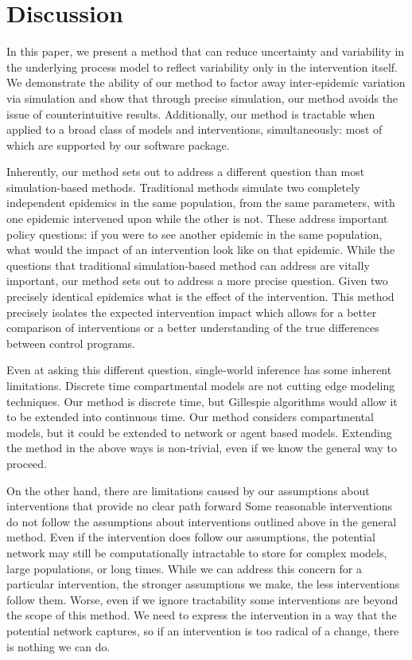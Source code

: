 \documentclass[PTRSB]{rsos}
\begin{document}
\section{Discussion}
In this paper, we present a method that can reduce uncertainty and variability in the underlying process model to reflect variability only in the intervention itself.
We demonstrate the ability of our method to factor away inter-epidemic variation via simulation and show that through precise simulation, our method avoids the issue of counterintuitive results. 
Additionally, our method is tractable when applied to a broad class of models and interventions, simultaneously: most of which are supported by our software package.

Inherently, our method sets out to address a different question than most simulation-based methods. 
Traditional methods simulate two completely independent epidemics in the same population, from the same parameters, with one epidemic intervened upon while the other is not. 
These address important policy questions: if you were to see another epidemic in the same population, what would the impact of an intervention look like on that epidemic. 
While the questions that traditional simulation-based method can address are vitally important, our method sets out to address a more precise question. 
Given two precisely identical epidemics what is the effect of the intervention. 
This method precisely isolates the expected intervention impact which allows for a better comparison of interventions or a better understanding of the true differences between control programs.

Even at asking this different question, single-world inference has some inherent limitations.
Discrete time compartmental models are not cutting edge modeling techniques.
Our method is discrete time, but Gillespie algorithms would allow it to be extended into continuous time.
Our method considers compartmental models, but it could be extended to network or agent based models.
Extending the method in the above ways is non-trivial, even if we know the general way to proceed.

On the other hand, there are limitations caused by our assumptions about interventions that provide no clear path forward
Some reasonable interventions do not follow the assumptions about interventions outlined above in the general method.
Even if the intervention does follow our assumptions, the potential network may still be computationally intractable to store for complex models, large populations, or long times.
While we can address this concern for a particular intervention, the stronger assumptions we make, the less interventions follow them.
Worse, even if we ignore tractability some interventions are beyond the scope of this method.
We need to express the intervention in a way that the potential network captures, so if an intervention is too radical of a change, there is nothing we can do.
\end{document}
